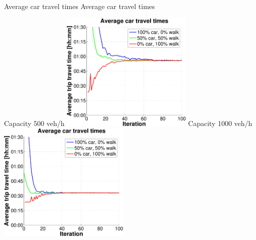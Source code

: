 \createfigure%
{Average car travel times}%
{Average car travel times}%
{\label{fig:InitialModeAverageCarTravelTime}}%
{%
  \createsubfigure%
  {Capacity 500 veh/h}%
  {\includegraphics[width=0.47\textwidth, angle=0, trim=0mm 0mm 0mm 9mm, clip=true]{extending/figures/MultiModalSimulation/simulations/avg_car_traveltime_500}}%
  {\label{}}%
  {\hspace{3mm}}%
  \createsubfigure%
  {Capacity 1000 veh/h}%
  {\includegraphics[width=0.47\textwidth, angle=0, trim=0mm 0mm 0mm 9mm, clip=true]{extending/figures/MultiModalSimulation/simulations/avg_car_traveltime_1000}}%
  {\label{}}%
  {\vspace{7.5mm}}%

}
